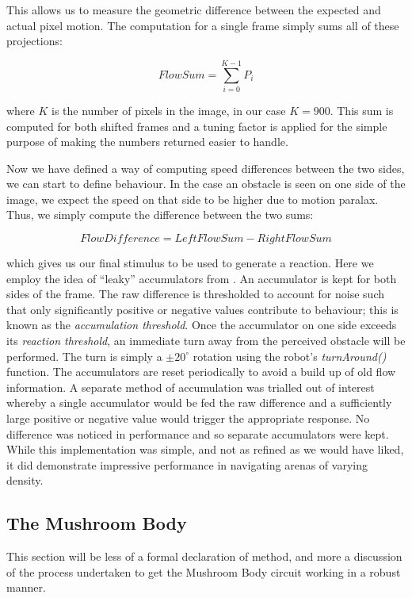 \documentclass[a4paper,12pt]{article}
\begin{document}
This allows us to measure the geometric difference between the expected and actual pixel motion. The computation
for a single frame simply sums all of these projections:

\begin{equation}
  FlowSum = \sum_{i = 0}^{K - 1} P_i
\end{equation}

where $K$ is the number of pixels in the image, in our case $K = 900$. This sum is computed for both shifted frames
and a tuning factor is applied for the simple purpose of making the numbers returned easier to handle.
\newline

Now we have defined a way of computing speed differences between the two sides, we
can start to define behaviour. In the case an obstacle is seen on one side of the image, we expect the speed
on that side to be higher due to motion paralax. Thus, we simply compute the difference between the
two sums:

\begin{equation}
FlowDifference = LeftFlowSum - RightFlowSum
\end{equation}

which gives us our final stimulus to be used to generate a reaction. Here we employ the idea of ``leaky'' accumulators
from \cite{Stewart2010}. An accumulator is kept for both sides of the frame. The raw difference is thresholded to account
for noise such that only significantly positive or negative values contribute to behaviour; this is known as the
\textit{accumulation threshold}. Once the accumulator on one side exceeds its \textit{reaction threshold}, an immediate
turn away from the perceived obstacle will be performed. The turn is simply a $\pm 20^{\circ}$ rotation using the robot's
\textit{turnAround()} function. The accumulators are reset periodically to avoid a build up of old flow information.
A separate method of accumulation was trialled out of interest whereby a single accumulator would be fed the raw difference
and a sufficiently large positive or negative value would trigger the appropriate response. No difference was noticed in
performance and so separate accumulators were kept. While this implementation was simple, and not as refined
as we would have liked, it did demonstrate impressive performance in navigating arenas of varying density.

\subsection{The Mushroom Body}
This section will be less of a formal declaration of method, and more a discussion of the process undertaken to get
the Mushroom Body circuit working in a robust manner.
\end{document}
